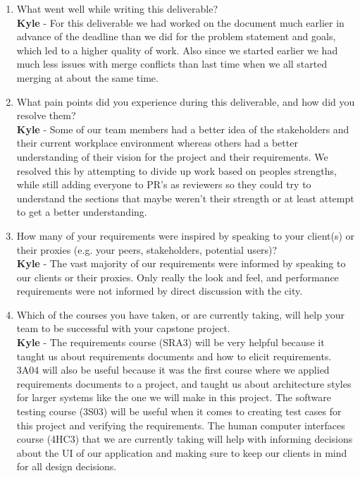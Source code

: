 \documentclass[12pt]{article}
\begin{document}
\begin{enumerate}
  \item What went well while writing this deliverable? \\
  \textbf{Kyle} - For this deliverable we had worked on the document much
  earlier in advance of the deadline than we did for the problem statement and
  goals, which led to a higher quality of work. Also since we started earlier
  we had much less issues with merge conflicts than last time when we all
  started merging at about the same time.
  \item What pain points did you experience during this deliverable, and how did
  you resolve them? \\
  \textbf{Kyle} - Some of our team members had a better idea of the stakeholders
  and their current workplace environment whereas others had a better
  understanding of their vision for the project and their requirements. We
  resolved this by attempting to divide up work based on peoples strengths, while
  still adding everyone to PR's as reviewers so they could try to understand the
  sections that maybe weren't their strength or at least attempt to get a better
  understanding.
  \item How many of your requirements were inspired by speaking to your
  client(s) or their proxies (e.g. your peers, stakeholders, potential users)? \\
  \textbf{Kyle} - The vast majority of our requirements were informed by speaking
  to our clients or their proxies. Only really the look and feel, and performance
  requirements were not informed by direct discussion with the city.
  \item Which of the courses you have taken, or are currently taking, will help
  your team to be successful with your capstone project. \\
  \textbf{Kyle} - The requirements course (SRA3) will be very helpful because it
  taught us about requirements documents and how to elicit requirements. 3A04 will
  also be useful because it was the first course where we applied requirements
  documents to a project, and taught us about architecture styles for larger
  systems like the one we will make in this project. The software testing course
  (3S03) will be useful when it comes to creating test cases for this project and
  verifying the requirements. The human computer interfaces course (4HC3) that we
  are currently taking will help with informing decisions about the UI of our 
  application and making sure to keep our clients in mind for all design decisions.

\end{enumerate}
\end{document}

